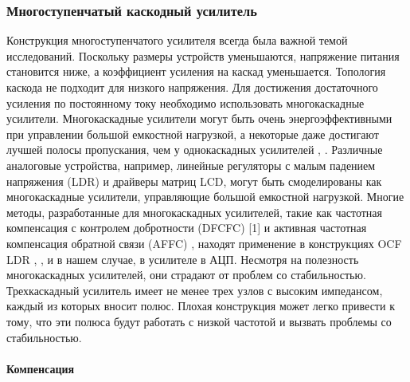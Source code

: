 \documentclass[a4paper,12pt]{article} %
\begin{document}
\subsubsection{Многоступенчатый каскодный усилитель}

Конструкция многоступенчатого усилителя всегда была важной темой исследований. Поскольку размеры устройств уменьшаются, напряжение питания становится ниже, а коэффициент усиления на каскад уменьшается. Топология каскода не подходит для низкого напряжения. Для достижения достаточного усиления по постоянному току необходимо использовать многокаскадные усилители. Многокаскадные усилители могут быть очень энергоэффективными при управлении большой емкостной нагрузкой, а некоторые даже достигают лучшей полосы пропускания, чем у однокаскадных усилителей \cite{op_amp_comp1}, \cite{op_amp_comp2}. Различные аналоговые устройства, например, линейные регуляторы с малым падением напряжения (LDR) и  драйверы матриц LCD, могут быть смоделированы как многокаскадные усилители, управляющие большой емкостной нагрузкой. Многие методы, разработанные для многокаскадных усилителей, такие как частотная компенсация с контролем добротности (DFCFC) [1] и активная частотная компенсация обратной связи (AFFC) \cite{op_amp_comp1}, находят применение в конструкциях OCF LDR \cite{op_amp_comp3}, \cite{op_amp_comp4}, и в нашем случае, в усилителе в АЦП. Несмотря на полезность многокаскадных усилителей, они страдают от проблем со стабильностью. Трехкаскадный усилитель имеет не менее трех узлов с высоким импедансом, каждый из которых вносит полюс. Плохая конструкция может легко привести к тому, что эти полюса будут работать с низкой частотой и вызвать проблемы со стабильностью.  


\paragraph{Компенсация}\label{compensate}
\end{document}
